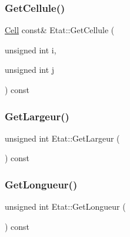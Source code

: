 \mbox{\label{class_etat_ab1d86c7e7e812d434057ed88848cc7f6}} 
\subsubsection{\texorpdfstring{Get\+Cellule()}{GetCellule()}\hspace{0.1cm}{\footnotesize\ttfamily [2/2]}}
{\footnotesize\ttfamily \mbox{\hyperlink{class_cell}{Cell}} const\& Etat\+::\+Get\+Cellule (\begin{DoxyParamCaption}\item[{unsigned int}]{i,  }\item[{unsigned int}]{j }\end{DoxyParamCaption}) const\hspace{0.3cm}{\ttfamily [inline]}}

\mbox{\label{class_etat_a6c67137de7313e23c40a77f10417c70e}} 
\subsubsection{\texorpdfstring{Get\+Largeur()}{GetLargeur()}}
{\footnotesize\ttfamily unsigned int Etat\+::\+Get\+Largeur (\begin{DoxyParamCaption}{ }\end{DoxyParamCaption}) const\hspace{0.3cm}{\ttfamily [inline]}}

\mbox{\label{class_etat_ac0ecddd03a3429934f91a0fb44ef071e}} 
\subsubsection{\texorpdfstring{Get\+Longueur()}{GetLongueur()}}
{\footnotesize\ttfamily unsigned int Etat\+::\+Get\+Longueur (\begin{DoxyParamCaption}{ }\end{DoxyParamCaption}) const\hspace{0.3cm}{\ttfamily [inline]}}

\mbox{\label{class_etat_a3879d6c9ced28962cc79632dfb0abd84}} 
